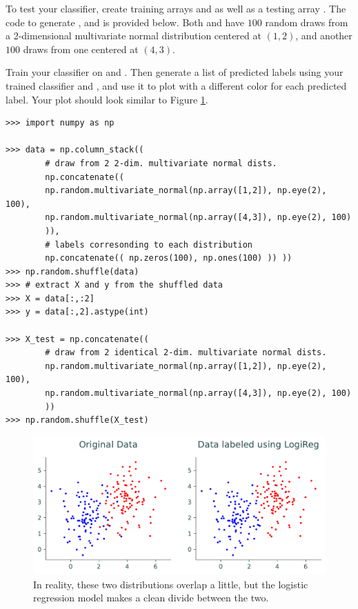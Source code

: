 \begin{problem}
    To test your classifier, create training arrays  and  as well as a testing array .
    The code to generate ,  and  is provided below.
    Both  and  have $100$ random draws from a 2-dimensional multivariate normal distribution centered at $(1,2)$, and another $100$ draws from one centered at $(4,3)$.

    Train your classifier on  and . 
    Then generate a list of predicted labels using your trained classifier and , and use it to plot  with a different color for each predicted label.
    Your plot should look similar to Figure \ref{fig:prob3}.

\begin{lstlisting}
>>> import numpy as np

>>> data = np.column_stack(( 
        # draw from 2 2-dim. multivariate normal dists.
        np.concatenate(( 
        np.random.multivariate_normal(np.array([1,2]), np.eye(2), 100),
        np.random.multivariate_normal(np.array([4,3]), np.eye(2), 100) 
        )), 
        # labels corresonding to each distribution
        np.concatenate(( np.zeros(100), np.ones(100) )) ))
>>> np.random.shuffle(data)
>>> # extract X and y from the shuffled data
>>> X = data[:,:2]
>>> y = data[:,2].astype(int)

>>> X_test = np.concatenate(( 
        # draw from 2 identical 2-dim. multivariate normal dists.
        np.random.multivariate_normal(np.array([1,2]), np.eye(2), 100),
        np.random.multivariate_normal(np.array([4,3]), np.eye(2), 100) 
        ))
>>> np.random.shuffle(X_test)
\end{lstlisting}
\end{problem}

\begin{figure}[H]
    \includegraphics[width=.9\textwidth]{figures/prob3_test.pdf}
    \caption{In reality, these two distributions overlap a little, but the logistic regression model makes a clean divide between the two.}
    \label{fig:prob3}
\end{figure}


